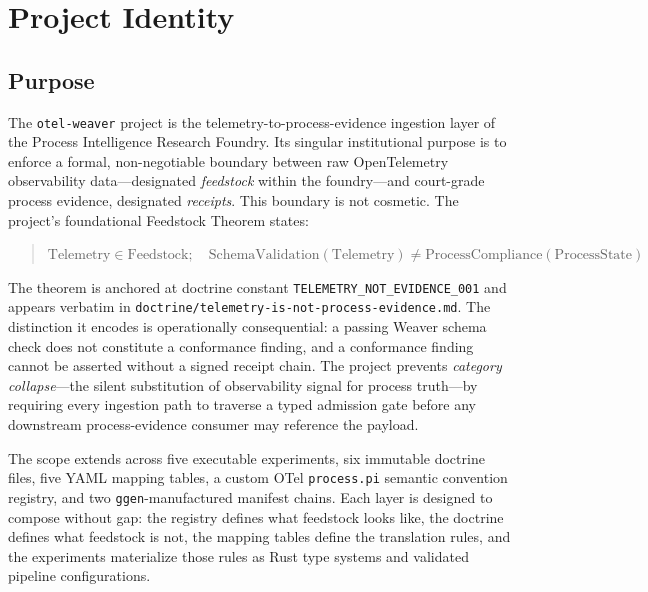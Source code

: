 
\section{Project Identity}
\label{sec:otel-weaver-identity}

\subsection{Purpose}
\label{sec:otel-weaver-identity-purpose}

The \texttt{otel-weaver} project is the telemetry-to-process-evidence ingestion layer of the
Process Intelligence Research Foundry. Its singular institutional purpose is to enforce a formal,
non-negotiable boundary between raw OpenTelemetry observability data---designated \emph{feedstock}
within the foundry---and court-grade process evidence, designated \emph{receipts}. This boundary is
not cosmetic. The project's foundational Feedstock Theorem states:
\begin{quote}
$\text{Telemetry} \in \text{Feedstock};\quad \text{SchemaValidation}(\text{Telemetry}) \neq
\text{ProcessCompliance}(\text{ProcessState})$
\end{quote}
The theorem is anchored at doctrine constant \texttt{TELEMETRY\_NOT\_EVIDENCE\_001} and appears
verbatim in \texttt{doctrine/telemetry-is-not-process-evidence.md}. The distinction it encodes is
operationally consequential: a passing Weaver schema check does not constitute a conformance
finding, and a conformance finding cannot be asserted without a signed receipt chain. The project
prevents \emph{category collapse}---the silent substitution of observability signal for process
truth---by requiring every ingestion path to traverse a typed admission gate before any downstream
process-evidence consumer may reference the payload.

The scope extends across five executable experiments, six immutable doctrine files, five YAML
mapping tables, a custom OTel \texttt{process.pi} semantic convention registry, and two
\texttt{ggen}-manufactured manifest chains. Each layer is designed to compose without gap: the
registry defines what feedstock looks like, the doctrine defines what feedstock is not, the mapping
tables define the translation rules, and the experiments materialize those rules as Rust type
systems and validated pipeline configurations.

